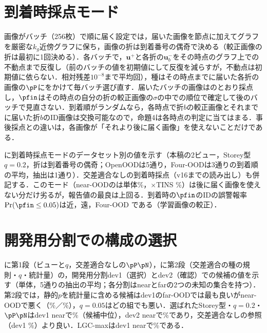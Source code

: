 \section{到着時採点モード}
\label{sec:app_online}
画像がバッチ（256枚）で順に届く設定では，届いた画像を節点に加えてグラフを厳密な$k_g$近傍グラフに保ち，画像の折は到着番号の偶奇で決める（較正画像の折は最初に1回決める）．各バッチで，$\mathbf{u}^{+}$と各折の$\mathbf{u}^{-}_b$をその時点のグラフ上での不動点まで反復し（前のバッチの値を初期値にして反復を減らすが，不動点は初期値に依らない．相対残差$10^{-8}$まで平均\NOnlItersMean{}回），種はその時点までに届いた各折の画像の$\pP$にをかけて毎バッチ選び直す．届いたバッチの画像はのとおり採点し，$\pfin$はその時点の自分の折の較正画像の$\sigma$の中での順位で確定して後のバッチで見直さない．到着順がランダムなら，各時点で折$b$の較正画像とそれまでに届いた折$b$のID画像は交換可能なので，命題4は各時点の判定に当てはまる．事後採点との違いは，各画像が「それより後に届く画像」を使えないことだけである．

に到着時採点モードのデータセット別の値を示す（本稿の2ビュー，Storey型$q{=}0.2$，折は到着番号の偶奇；OpenOODは5通り，Four-OODは3通りの到着順の平均，抽出は1通り）．交差適合なしの到着時採点（v16までの読み出し）も併記する．このモード（near-OODの\FPR{}は単体\NOnlOneFourNoneNearFpr\%，$\times$TINS \NOnlOneFourTinsNearFpr\%）は後に届く画像を使えない分だけ劣るが，報告値の最良は上回る．到着時の$\pfin$のIDの誤警報率$\Pr(\pfin\le0.05)$は近\NOnlOneFourValNearFprZeroZeroFive{}，遠\NOnlOneFourValFarFprZeroZeroFive{}，Four-OOD \NOnlOneFourValFourFprZeroZeroFive{}である（学習画像の較正）．

\begin{table}[htbp]
\centering
\caption{到着時採点モードのデータセット別の値（[\%]，AUROC／FPR95）．}
\label{tab:online}
\vspace{1.5mm}

\end{table}

\section{開発用分割での構成の選択}
\label{sec:app_sel}
に第1段（ビューと$q$，交差適合なしの$\pP\pN$），に第2段（交差適合の種の規則・$q$・統計量）の，開発用分割dev1（選択）とdev2（確認）での候補の値を示す（単体，5通りの抽出の平均；各分割はnearとfarの2つの未知の集合を持つ）．第2段では，静的$p$を統計量に含める候補はdev1のfar-OODでは最も良いがnear-OODで悪く（\NSelqDevOnePpsNearFpr\%／\NSelqDevOnePpsFarFpr\%），$q{=}0.05$はどの組でも悪い．選ばれたStorey型・$q{=}0.2$・$\pP\pN$はdev1 nearで\NSelqDevOneNearFpr\%（\NSelqNCandidates{}候補中\NSelqDevOneRankOfChosen{}位），dev2 nearで\NSelqDevTwoNearFpr\%であり，交差適合なしの参照（dev1 \NSelqRefDevOneNearFpr\%）より良い．LGC-maxはdev1 nearで\NSelqDevOneLgcNearFpr\%である．

